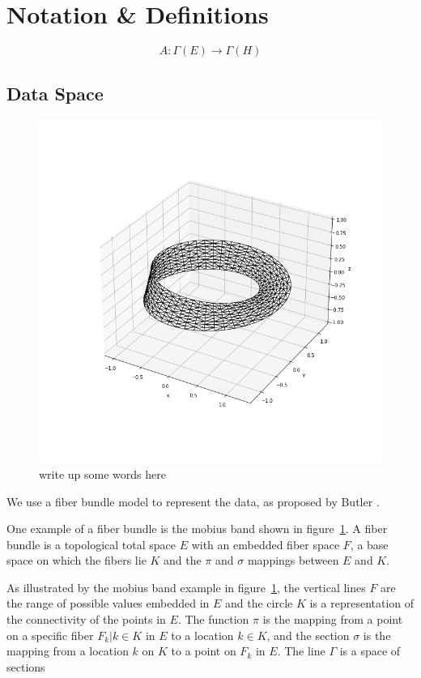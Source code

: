 \documentclass[../intro.tex]{subfiles}
\begin{document}
\section{Notation \& Definitions}

\begin{equation}
    A: \Gamma(E) \rightarrow \Gamma(H)
\end{equation}


 
\subsection{Data Space}
\begin{figure}[ht]
    \label{fig:mobius}
    \includegraphics[width=0.5\linewidth]{figures/sections/math/mobius.png}
    \caption{write up some words here}
\end{figure}

We use a fiber bundle model to represent the data, as proposed by Butler 
\cite{butlerVectorBundleClassesForm1992,butlerVisualizationModelBased1989}. 


One example of a fiber bundle is the mobius band shown in figure~\ref{fig:mobius}. A fiber bundle is a topological total space $E$ with an embedded fiber space $F$, a base space on which the fibers lie $K$ and the $\pi$ and $\sigma$ mappings between $E$ and $K$.  


As illustrated by the mobius band example in figure~\ref{fig:mobius}, the vertical lines $F$ are the range of possible values embedded in $E$ and the circle $K$ is a representation of the connectivity of the points in $E$. The function $\pi$ is the mapping from a point on a specific fiber $F_{k}|k\in K$ in $E$ to a location $k \in K$, and the section $\sigma$ is the mapping from a location $k$ on $K$ to a point on $F_{k}$ in $E$. The line $\Gamma$ is a space of sections
\end{document}
